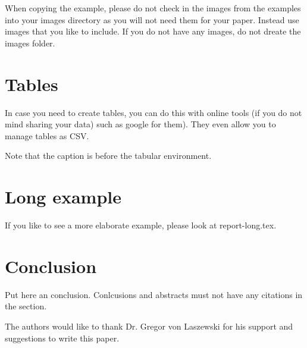\documentclass[sigconf]{acmart}
\begin{document}
When copying the example, please do not check in the images from the
examples into your images directory as you will not need them for your
paper. Instead use images that you like to include. If you do not have
any images, do not dreate the images folder.

\section{Tables}

In case you need to create tables, you can do this with online tools
(if you do not mind sharing your data) such as
google for them). They even allow you to manage tables as CSV.

Note that the caption is before the tabular environment.


\section{Long example}

If you like to see a more elaborate example, please look at
report-long.tex. 

\section{Conclusion}

Put here an conclusion. Conlcusions and abstracts must not have any
citations in the section.


\begin{acks}

  The authors would like to thank Dr. Gregor von Laszewski for his
  support and suggestions to write this paper.

\end{acks}


 

\appendix
\end{document}
